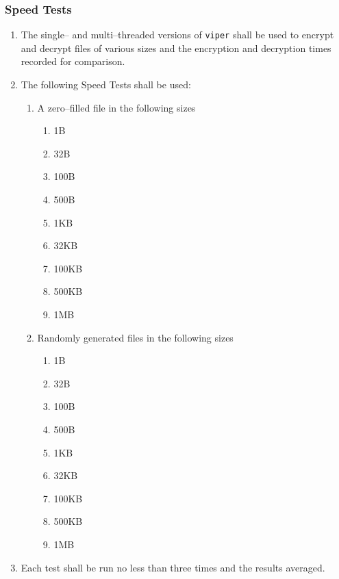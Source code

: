\subsubsection{Speed Tests}
\begin{enumerate}
\item The single-- and multi--threaded versions of \texttt{viper} shall be used to encrypt and decrypt files of various sizes and the encryption and decryption times recorded for comparison.
\item The following Speed Tests shall be used:
	\begin{enumerate}
	\item A zero--filled file in the following sizes
		\begin{enumerate}
		\item 1B
		\item 32B
		\item 100B
		\item 500B
		\item 1KB
		\item 32KB
		\item 100KB
		\item 500KB
		\item 1MB
		\end{enumerate}
	\item Randomly generated files in the following sizes
		\begin{enumerate}
		\item 1B
		\item 32B
		\item 100B
		\item 500B
		\item 1KB
		\item 32KB
		\item 100KB
		\item 500KB
		\item 1MB
		\end{enumerate}
	\end{enumerate}
\item Each test shall be run no less than three times and the results averaged.
\end{enumerate}
